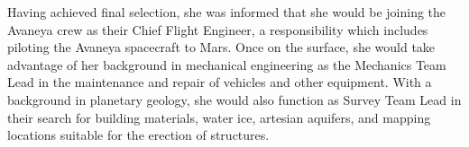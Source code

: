 Having achieved final selection, she was informed that she would be joining the Avaneya crew as their Chief Flight Engineer, a responsibility which includes piloting the Avaneya spacecraft to Mars. Once on the surface, she would take advantage of her background in mechanical engineering as the Mechanics Team Lead in the maintenance and repair of vehicles and other equipment. With a background in planetary geology, she would also function as Survey Team Lead in their search for building materials, water ice, artesian aquifers, and mapping locations suitable for the erection of structures.

